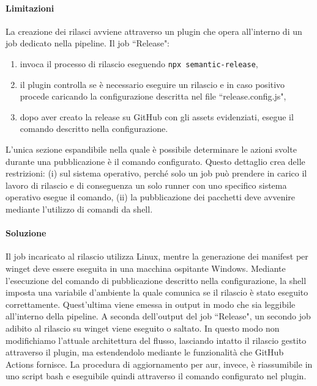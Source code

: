 \paragraph{Limitazioni} La creazione dei rilasci avviene attraverso un plugin che opera all'interno di un job dedicato nella pipeline. Il job ``Release": 
\begin{enumerate}
	\item invoca il processo di rilascio eseguendo \texttt{npx semantic-release},
	\item il plugin controlla se è necessario eseguire un rilascio e in caso positivo procede caricando la configurazione descritta nel file ``release.config.js",
	\item dopo aver creato la release su GitHub con gli assets evidenziati, esegue il comando descritto nella configurazione.
\end{enumerate}
L'unica sezione espandibile nella quale è possibile determinare le azioni svolte durante una pubblicazione è il comando configurato. Questo dettaglio crea delle restrizioni: (i) sul sistema operativo, perché solo un job può prendere in carico il lavoro di rilascio e di conseguenza un solo runner con uno specifico sistema operativo esegue il comando, (ii) la pubblicazione dei pacchetti deve avvenire mediante l'utilizzo di comandi da shell.

\paragraph{Soluzione} Il job incaricato al rilascio utilizza Linux, mentre la generazione dei manifest per winget deve essere eseguita in una macchina ospitante Windows. Mediante l'esecuzione del comando di pubblicazione descritto nella configurazione,  la shell imposta una variabile d'ambiente la quale comunica se il rilascio è stato eseguito correttamente. Quest'ultima viene emessa in output in modo che sia leggibile all'interno della pipeline. A seconda dell'output del job ``Release", un secondo job adibito al rilascio su winget viene eseguito o saltato. In questo modo non modifichiamo l'attuale architettura del flusso, lasciando intatto il rilascio gestito attraverso il plugin, ma estendendolo mediante le funzionalità che GitHub Actions fornisce. La procedura di aggiornamento per \ac{aur}, invece, è riassumibile in uno script bash e eseguibile quindi attraverso il comando configurato nel plugin.